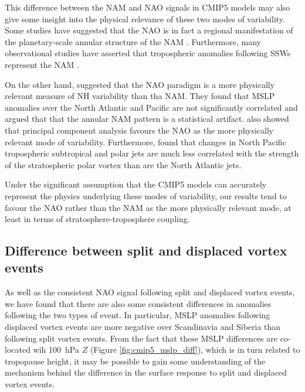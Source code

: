 This difference between the NAM and NAO signals in CMIP5 models may also give
some insight into the physical relevance of these two modes of variability. Some
studies have suggested that the NAO is in fact a regional manifestation of the
planetary-scale annular structure of the NAM \citep[e.g.,][]{Thompson1998,
  Wallace2002}. Furthermore, many observational studies have asserted that
tropospheric anomalies following SSWs represent the NAM
\citep[e.g.,][]{Baldwin1999,Baldwin2001a,Thompson2000}. 

On the other hand, \citet{Ambaum2001} suggested that the NAO paradigm is a more
physically relevant measure of NH variability than tha NAM. They found that MSLP
anomalies over the North Atlantic and Pacific are not significantly correlated
and argued that that the annular NAM pattern is a statistical
artifact. \citet{Huth2006} also showed that principal component analysis favours
the NAO as the more physically relevant mode of variability. Furthermore,
\citet{Ambaum2002} found that changes in North Pacific tropospheric subtropical
and polar jets are much less correlated with the strength of the stratospheric
polar vortex than are the North Atlantic jets.

Under the significant assumption that the CMIP5 models can accurately represent
the physics underlying these modes of variability, our results tend to favour
the NAO rather than the NAM as the more physically relevant mode, at least in
terms of stratosphere-troposphere coupling. 





\subsection{Difference between split and displaced vortex events}
\label{sec:cmip5_discuss_split_displ}

As well as the consistent NAO signal following split and displaced vortex
events, we have found that there are also some consistent differences in
anomalies following the two types of event. In particular, MSLP anomalies
following displaced vortex events are more negative over Scandinavia and Siberia
than following split vortex events. From the fact that these MSLP differences
are co-located wih 100~hPa $Z$ (Figure \ref{fig:cmip5_mslp_diff}), which is in
turn related to tropopause height, it may be possible to gain some understanding
of the mechanism behind the difference in the surface response to split and
displaced vortex events. 

